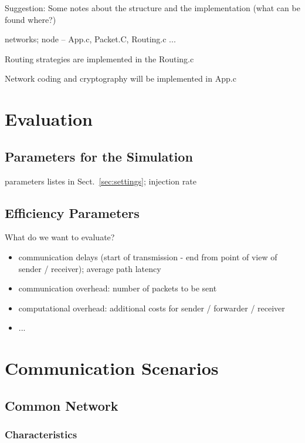 \documentclass[12pt]{article}
\begin{document}
Suggestion: Some notes about the structure and the implementation (what can be found where?)

networks; node -- App.c, Packet.C, Routing.c ...

Routing strategies are implemented in the Routing.c

Network coding and cryptography will be implemented in App.c



\section{Evaluation}

\subsection{Parameters for the Simulation}

parameters listes in Sect.~\ref{sec:settings}; injection rate

\subsection{Efficiency Parameters}

What do we want to evaluate?

\begin{itemize}
	\item communication delays (start of transmission - end from point of view of sender / receiver); average path latency
	\item communication overhead: number of packets to be sent
	\item computational overhead: additional costs for sender / forwarder / receiver
	\item ...
\end{itemize}

\section{Communication Scenarios}

\subsection{Common Network}

\subsubsection{Characteristics}
\end{document}
